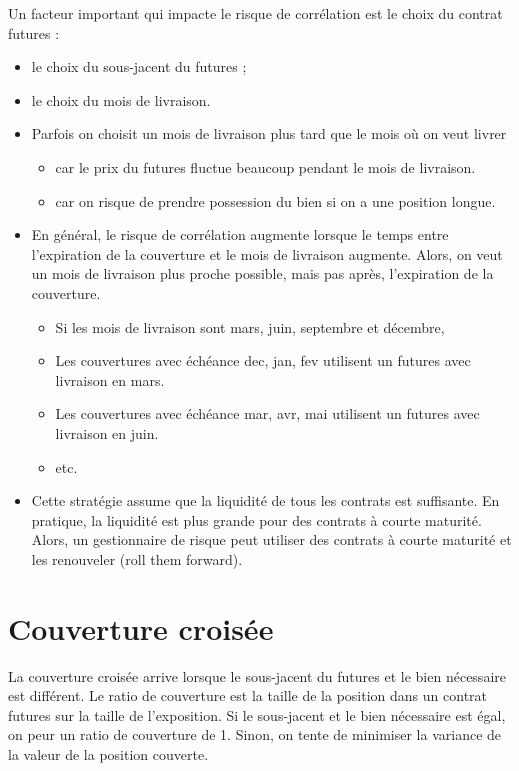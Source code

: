 Un facteur important qui impacte le risque de corrélation est le choix du contrat futures : 
\begin{itemize}
	\item le choix du sous-jacent du futures ;
	\item le choix du mois de livraison.
\end{itemize}

\begin{itemize}
	\item Parfois on choisit un mois de livraison plus tard que le mois où on veut livrer
	\begin{itemize}
		\item car le prix du futures fluctue beaucoup pendant le mois de livraison. 
		\item car on risque de prendre possession du bien si on a une position longue.
	\end{itemize}
	\item En général, le risque de corrélation augmente lorsque le temps entre l'expiration de la couverture et le mois de livraison augmente. Alors, on veut un mois de livraison plus proche possible, mais pas après, l'expiration de la couverture. 
	\begin{itemize}
		\item Si les mois de livraison sont mars, juin, septembre et décembre, 
		\item Les couvertures avec échéance dec, jan, fev utilisent un futures avec livraison en mars. 
		\item Les couvertures avec échéance mar, avr, mai utilisent un futures avec livraison en juin. 
		\item etc. 
	\end{itemize}
	\item Cette stratégie assume que la liquidité de tous les contrats est suffisante. En pratique, la liquidité est plus grande pour des contrats à courte maturité. Alors, un gestionnaire de risque peut utiliser des contrats à courte maturité et les renouveler (roll them forward). 
\end{itemize}

\section{Couverture croisée}

La couverture croisée arrive lorsque le sous-jacent du futures et le bien nécessaire est différent. Le ratio de couverture est la taille de la position dans un contrat futures sur la taille de l'exposition. Si le sous-jacent et le bien nécessaire est égal, on peur un ratio de couverture de 1. Sinon, on tente de minimiser la variance de la valeur de la position couverte. 

